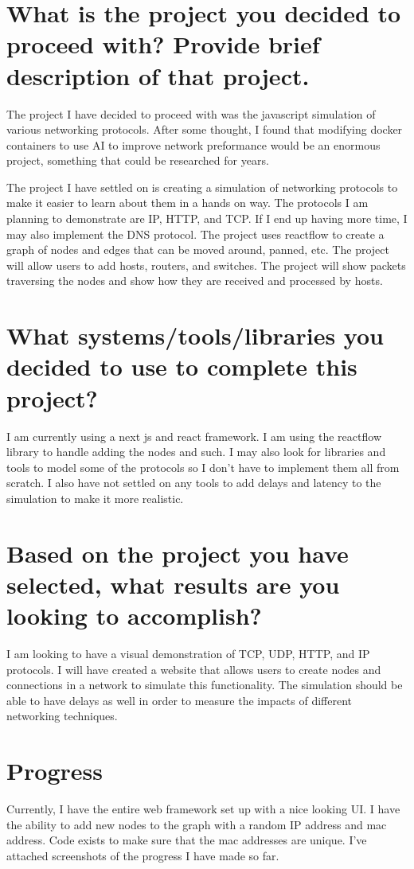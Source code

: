 \documentclass{assignment-x}
\begin{document}
\maketitle
\pagebreak

\section{What is the project you decided to proceed with? Provide brief description of that project.}
The project I have decided to proceed with was the javascript simulation of various networking protocols. After some thought, I found that modifying docker containers to use AI to improve network preformance would be an enormous project, something that could be researched for years. 

The project I have settled on is creating a simulation of networking protocols to make it easier to learn about them in a hands on way. The protocols I am planning to demonstrate are IP, HTTP, and TCP. If I end up having more time, I may also implement the DNS protocol. The project uses reactflow to create a graph of nodes and edges that can be moved around, panned, etc. The project will allow users to add hosts, routers, and switches. The project will show packets traversing the nodes and show how they are received and processed by hosts. 

\section{What systems/tools/libraries you decided to use to complete this project?}
I am currently using a next js and react framework. I am using the reactflow library to handle adding the nodes and such. I may also look for libraries and tools to model some of the protocols so I don't have to implement them all from scratch. I also have not settled on any tools to add delays and latency to the simulation to make it more realistic.

\section{Based on the project you have selected, what results are you looking to accomplish?}
I am looking to have a visual demonstration of TCP, UDP, HTTP, and IP protocols. I will have created a website that allows users to create nodes and connections in a network to simulate this functionality. The simulation should be able to have delays as well in order to measure the impacts of different networking techniques. 

\section{Progress}
Currently, I have the entire web framework set up with a nice looking UI. I have the ability to add new nodes to the graph with a random IP address and mac address. Code exists to make sure that the mac addresses are unique. I've attached screenshots of the progress I have made so far.
\end{document}
